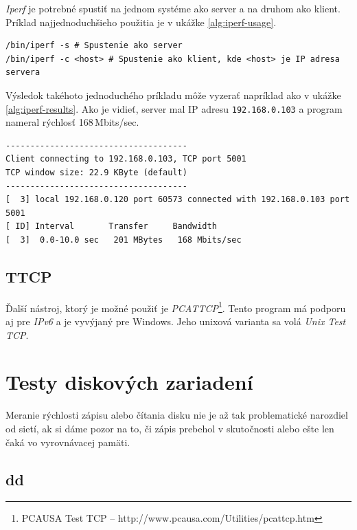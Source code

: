 \emph{Iperf} je potrebné spustiť na jednom systéme ako server a na druhom ako
klient. Príklad najjednoduchšieho použitia je v ukážke \ref{alg:iperf-usage}.
\\
\renewcommand{\lstlistingname}{Ukážka}
\begin{lstlisting}[label=alg:iperf-usage,caption=Príklad použitia iperf]
/bin/iperf -s # Spustenie ako server
/bin/iperf -c <host> # Spustenie ako klient, kde <host> je IP adresa servera
\end{lstlisting}
\renewcommand{\lstlistingname}{\listingAlgoritmus}

Výsledok takéhoto jednoduchého príkladu môže vyzerať napríklad ako v ukážke
\ref{alg:iperf-results}. Ako je vidieť, server mal IP adresu
\texttt{192.168.0.103} a program nameral rýchlosť 168\,Mbits/sec.
\\
\renewcommand{\lstlistingname}{Ukážka}
\begin{lstlisting}[label=alg:iperf-results,caption=Výstup z programu iperf]
-------------------------------------
Client connecting to 192.168.0.103, TCP port 5001
TCP window size: 22.9 KByte (default)
-------------------------------------
[  3] local 192.168.0.120 port 60573 connected with 192.168.0.103 port 5001
[ ID] Interval       Transfer     Bandwidth
[  3]  0.0-10.0 sec   201 MBytes   168 Mbits/sec
\end{lstlisting}
\renewcommand{\lstlistingname}{\listingAlgoritmus}

%
%

\subsection{TTCP}

Ďalší nástroj, ktorý je možné použiť je \emph{PCATTCP}\footnote{PCAUSA Test TCP
-- http://www.pcausa.com/Utilities/pcattcp.htm}. Tento program má podporu aj
pre \emph{IPv6} a je vyvýjaný pre Windows. Jeho unixová varianta sa volá
\emph{Unix Test TCP}. 

\section{Testy diskových zariadení}

Meranie rýchlosti zápisu alebo čítania disku nie je až tak problematické
narozdiel od sietí, ak si dáme pozor na to, či zápis prebehol v skutočnosti
alebo ešte len čaká vo vyrovnávacej pamäti.

%
%

\subsection{dd}

